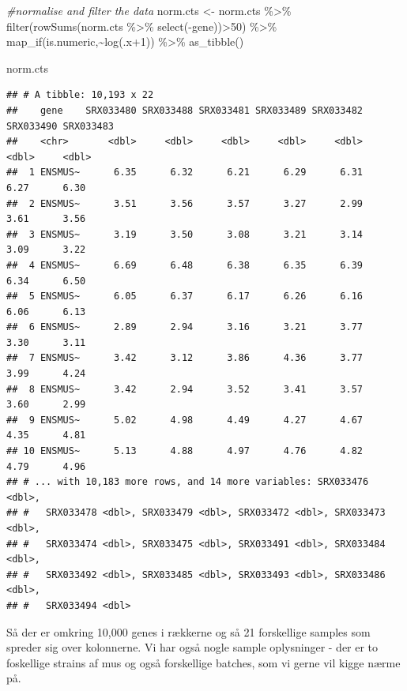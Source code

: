 \documentclass[
]{book}
\newenvironment{Shaded}{\begin{snugshade}}{\end{snugshade}}
\newcommand{\CommentTok}[1]{\textcolor[rgb]{0.56,0.35,0.01}{\textit{#1}}}
\newcommand{\DecValTok}[1]{\textcolor[rgb]{0.00,0.00,0.81}{#1}}
\newcommand{\FunctionTok}[1]{\textcolor[rgb]{0.00,0.00,0.00}{#1}}
\newcommand{\NormalTok}[1]{#1}
\newcommand{\OtherTok}[1]{\textcolor[rgb]{0.56,0.35,0.01}{#1}}
\newcommand{\SpecialCharTok}[1]{\textcolor[rgb]{0.00,0.00,0.00}{#1}}
\begin{document}
\begin{Shaded}
\begin{Highlighting}[]
\CommentTok{\#normalise and filter the data}
\NormalTok{norm.cts }\OtherTok{\textless{}{-}}\NormalTok{ norm.cts }\SpecialCharTok{\%\textgreater{}\%} 
  \FunctionTok{filter}\NormalTok{(}\FunctionTok{rowSums}\NormalTok{(norm.cts }\SpecialCharTok{\%\textgreater{}\%} \FunctionTok{select}\NormalTok{(}\SpecialCharTok{{-}}\NormalTok{gene))}\SpecialCharTok{\textgreater{}}\DecValTok{50}\NormalTok{) }\SpecialCharTok{\%\textgreater{}\%} 
  \FunctionTok{map\_if}\NormalTok{(is.numeric,}\SpecialCharTok{\textasciitilde{}}\FunctionTok{log}\NormalTok{(.x}\SpecialCharTok{+}\DecValTok{1}\NormalTok{)) }\SpecialCharTok{\%\textgreater{}\%} \FunctionTok{as\_tibble}\NormalTok{()}

\NormalTok{norm.cts}
\end{Highlighting}
\end{Shaded}

\begin{verbatim}
## # A tibble: 10,193 x 22
##    gene    SRX033480 SRX033488 SRX033481 SRX033489 SRX033482 SRX033490 SRX033483
##    <chr>       <dbl>     <dbl>     <dbl>     <dbl>     <dbl>     <dbl>     <dbl>
##  1 ENSMUS~      6.35      6.32      6.21      6.29      6.31      6.27      6.30
##  2 ENSMUS~      3.51      3.56      3.57      3.27      2.99      3.61      3.56
##  3 ENSMUS~      3.19      3.50      3.08      3.21      3.14      3.09      3.22
##  4 ENSMUS~      6.69      6.48      6.38      6.35      6.39      6.34      6.50
##  5 ENSMUS~      6.05      6.37      6.17      6.26      6.16      6.06      6.13
##  6 ENSMUS~      2.89      2.94      3.16      3.21      3.77      3.30      3.11
##  7 ENSMUS~      3.42      3.12      3.86      4.36      3.77      3.99      4.24
##  8 ENSMUS~      3.42      2.94      3.52      3.41      3.57      3.60      2.99
##  9 ENSMUS~      5.02      4.98      4.49      4.27      4.67      4.35      4.81
## 10 ENSMUS~      5.13      4.88      4.97      4.76      4.82      4.79      4.96
## # ... with 10,183 more rows, and 14 more variables: SRX033476 <dbl>,
## #   SRX033478 <dbl>, SRX033479 <dbl>, SRX033472 <dbl>, SRX033473 <dbl>,
## #   SRX033474 <dbl>, SRX033475 <dbl>, SRX033491 <dbl>, SRX033484 <dbl>,
## #   SRX033492 <dbl>, SRX033485 <dbl>, SRX033493 <dbl>, SRX033486 <dbl>,
## #   SRX033494 <dbl>
\end{verbatim}

Så der er omkring 10,000 genes i rækkerne og så 21 forskellige samples som spreder sig over kolonnerne. Vi har også nogle sample oplysninger - der er to foskellige strains af mus og også forskellige batches, som vi gerne vil kigge nærme på.
\end{document}

